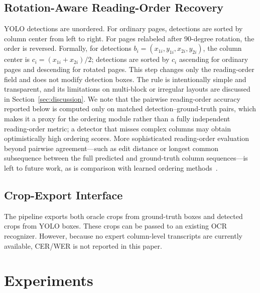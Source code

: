 \documentclass[12pt]{article}
\begin{document}
\subsection{Rotation-Aware Reading-Order Recovery}
YOLO detections are unordered. For ordinary pages, detections are sorted by column center from left to right. For pages relabeled after 90-degree rotation, the order is reversed. Formally, for detections $b_i=(x_{1i},y_{1i},x_{2i},y_{2i})$, the column center is $c_i=(x_{1i}+x_{2i})/2$; detections are sorted by $c_i$ ascending for ordinary pages and descending for rotated pages. This step changes only the reading-order field and does not modify detection boxes. The rule is intentionally simple and transparent, and its limitations on multi-block or irregular layouts are discussed in Section~\ref{sec:discussion}. We note that the pairwise reading-order accuracy reported below is computed only on matched detection--ground-truth pairs, which makes it a proxy for the ordering module rather than a fully independent reading-order metric; a detector that misses complex columns may obtain optimistically high ordering scores. More sophisticated reading-order evaluation beyond pairwise agreement---such as edit distance or longest common subsequence between the full predicted and ground-truth column sequences---is left to future work, as is comparison with learned ordering methods~\cite{quiros2022reading}.

\subsection{Crop-Export Interface}
The pipeline exports both oracle crops from ground-truth boxes and detected crops from YOLO boxes. These crops can be passed to an existing OCR recognizer. However, because no expert column-level transcripts are currently available, CER/WER is not reported in this paper.

\section{Experiments}
\end{document}
